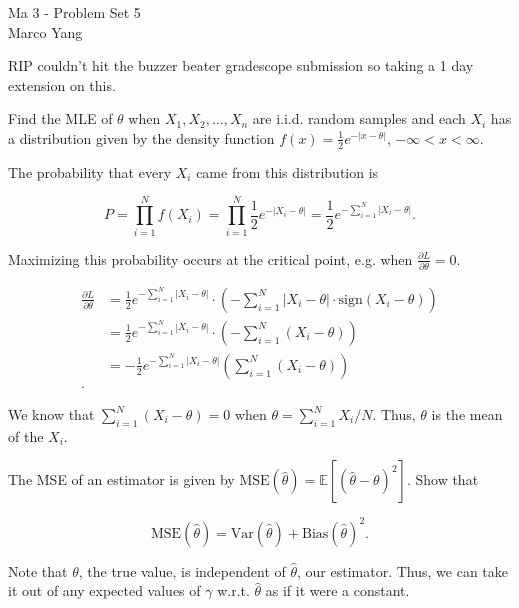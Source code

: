 \documentclass[answers]{exam}
\begin{document}
\begin{center}
{\Large Ma 3 - Problem Set 5} \\
\medskip
Marco Yang \\
\bigskip
\end{center}

RIP couldn't hit the buzzer beater gradescope submission so taking a 1 day extension on this.

\begin{questions}
\question [25] Find the MLE of $\theta$ when $X_1,X_2,\ldots,X_{n}$ are i.i.d.
random samples and each $X_{i}$ has a distribution given by the density function 
$f(x)=\frac{1}{2}e^{-|x-\theta|}$, $-\infty<x<\infty$.

\begin{solution}
The probability that every $X_{i}$ came from this distribution is


\[
P = \prod_{i=1}^{N} f(X_{i}) = \prod_{i=1}^{N} \frac{1}{2}e^{-|X_{i}-\theta|} = \frac{1}{2}e^{-\sum_{i=1}^{N}|X_{i}-\theta|}
.\] 

Maximizing this probability occurs at the critical point, e.g. when 
$\frac{\partial L}{\partial \theta} = 0$.

\begin{align*}
\frac{\partial L}{\partial \theta} &= \frac{1}{2}e^{-\sum_{i=1}^{N}|X_{i}-\theta|} \cdot \left( -\sum_{i=1}^{N} |X_{i} - \theta| \cdot \text{sign}(X_{i}-\theta) \right) \\
&= \frac{1}{2}e^{-\sum_{i=1}^{N}|X_{i}-\theta|} \cdot \left( -\sum_{i=1}^{N} (X_{i} - \theta) \right)  \\ 
&= -\frac{1}{2}e^{-\sum_{i=1}^{N}|X_{i}-\theta|} \left( \sum_{i=1}^{N} (X_{i} - \theta) \right)  \\ 
.\end{align*}

We know that $\sum_{i=1}^{N}(X_{i}-\theta) = 0$ when $\theta = \sum_{i=1}^{N}
X_{i} / N$. Thus, $\theta$ is the mean of the $X_{i}$.
\end{solution}

\question [25] The MSE of an estimator is given by $\text{MSE}(\hat{\theta}) 
= \mathbb{E}[(\hat{\theta}-\theta)^2]$. Show that 

\[
\text{MSE}(\hat{\theta}) = \text{Var}(\hat{\theta}) + \text{Bias}(\hat{\theta})^2
.\] 

\begin{solution}
Note that $\theta$, the true value, is independent of $\hat{\theta}$, our
estimator. Thus, we can take it out of any expected values of $\gamma$ w.r.t.
$\hat{\theta}$ as if it were a constant.


\end{solution}
\end{questions}
\end{document}
